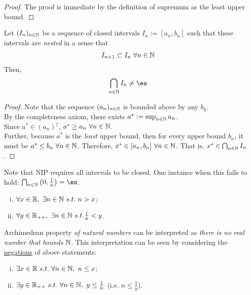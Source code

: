 \documentclass[11pt]{article}
\begin{document}
	\begin{proof}
		The proof is immediate by the definition of supremum as the least upper bound.
	\end{proof}
	
	\begin{theorem}
		Let $(I_n)_{n \in \mathbb{N}}$ be a sequence of closed intervals $I_n := [a_n, b_n]$ such that these intervals are \emph{nested} in a sense that
		\begin{align}
			I_{n+1} \subset I_n\ \forall n \in \mathbb{N}
		\end{align}
		Then,
		\begin{align}
			\bigcap_{n \in \N} I_n \neq \es
		\end{align}
	\end{theorem}
	
	\begin{proof}
		Note that the sequence $(a_n)_{n \in \mathbb{N}}$ is bounded above by any $b_k$.\\
		By the completeness axiom, there exists $a^* := \sup_{n \in \mathbb{N}} a_n$.\\
		Since $a^* \in (a_n)^\uparrow$, $a^* \geq a_n\ \forall n \in \mathbb{N}$.\\
		Further, because $a^*$ is the \emph{least} upper bound, then for every upper bound $b_n$, it must be $a^* \leq b_n\ \forall n \in \mathbb{N}$. Therefore, $x^* \in [a_n, b_n]\ \forall n \in \N$. That is, $x^* \in \bigcap_{n \in \mathbb{N}} I_n$.
	\end{proof}
	
	\begin{remark}
	Note that NIP requires all intervals to be closed. One instance when this fails to hold: $\bigcap_{n \in \N} \left(0, \frac{1}{n} \right) = \es$.
	\end{remark}
	
	\begin{theorem} \quad
		\begin{enumerate}[(i)]
			\item $\forall x \in \R,\ \exists n \in \N\ s.t.\ n > x$;
			\item $\forall y \in \mathbb{R}_{++},\ \exists n \in \mathbb{N}\ s.t. \frac{1}{n} < y$.
		\end{enumerate}
	\end{theorem}
	
	Archimedean property \emph{of natural numbers} can be interpreted as \emph{there is no real number that bounds $\mathbb{N}$}. This interpretation can be seen by considering the \ul{negations} of above statements:
	\begin{enumerate}[(i)]
		\item $\exists x \in \mathbb{R}\ s.t.\ \forall n \in \mathbb{N},\ n \leq x$;
		\item $\exists y \in \mathbb{R}_{++}\ s.t.\ \forall n \in \mathbb{N},\ y \leq \frac{1}{n}$ (i.e. $n \leq \frac{1}{y}$).
	\end{enumerate}
	
\end{document}
